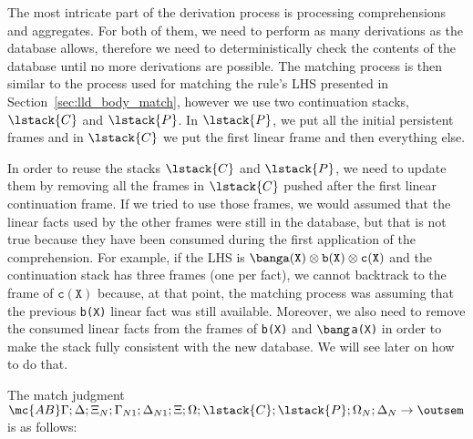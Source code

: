 The most intricate part of the derivation process is processing comprehensions
and aggregates. For both of them, we need to perform as many derivations as the
database allows, therefore we need to deterministically check the contents of
the database until no more derivations are possible.  The matching process is
then similar to the process used for matching the rule's LHS presented in
Section~\ref{sec:lld_body_match}, however we use two continuation stacks,
$\lstack{C}$ and $\lstack{P}$. In $\lstack{P}$, we put all the initial
persistent frames and in $\lstack{C}$ we put the first linear frame and then
everything else.

In order to reuse the stacks $\lstack{C}$ and $\lstack{P}$, we need to update them by removing all
the frames in $\lstack{C}$ pushed after the first linear continuation frame.  If we tried
to use those frames, we would assumed that the linear facts used by the other
frames were still in the database, but that is not true because they have been
consumed during the first application of the comprehension.  For example, if the
LHS is $\bang \mathtt{a(X)} \otimes \mathtt{b(X)} \otimes \mathtt{c(X)}$ and
the continuation stack has three frames (one per fact), we cannot backtrack to
the frame of $\mathtt{c(X)}$ because, at that point, the matching process was
assuming that the previous \texttt{b(X)} linear fact was still available.
Moreover, we also need to remove the consumed linear facts from the frames of
\texttt{b(X)} and $\bang$\texttt{a(X)} in order to make the stack fully
consistent with the new database. We will see later on how to do that.

The match judgment $\mc{AB} \Gamma; \Delta; \Xi_N; \Gamma_{N1}; \Delta_{N1};
\Xi; \Omega; \lstack{C}; \lstack{P}; \Omega_N; \Delta_N \rightarrow \outsem$ is
as follows:

